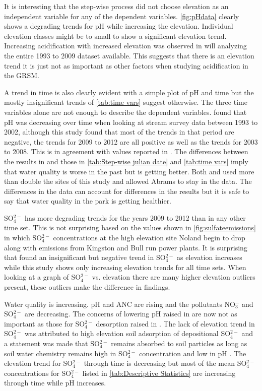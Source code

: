 It is interesting that the step-wise process did not choose elevation as an independent variable for any of the dependent variables. \autoref{fig:pHdata} clearly shows a degrading trends for pH while increasing the elevation. Individual elevation classes might be to small to show a significant elevation trend.  Increasing acidification with increased elevation was observed in \citet{cai2012} will analyzing the entire 1993 to 2009 dataset available.  This suggests that there is an elevation trend it is just not as important as other factors when studying acidification in the GRSM.

A trend in time is also clearly evident with a simple plot of pH and time but the mostly insignificant trends of \autoref{tab:time vars} suggest otherwise. The three time variables alone are not enough to describe the dependent variables.  \citet{robinson2008ph} found that pH was decreasing over time when looking at stream survey data between 1993 to 2002, although this study found that most of the trends in that period are negative, the trends for 2009 to 2012 are all positive as well as the trends for 2003 to 2008.  This is in agreement with values reported in \citet{cai2012}.  The differences between the results in \citet{robinson2008ph} and those in \autoref{tab:Step-wise julian date} and \autoref{tab:time vars} imply that water quality is worse in the past but is getting better.  Both \citet{robinson2008ph} and \citet{cai2012} used more than double the sites of this study and \citet{robinson2008ph} allowed Abrams to stay in the data.  The differences in the data can account for differences in the results but it is safe to say that water quality in the park is getting healthier.

SO$_4^{2-}$ has more degrading trends for the years 2009 to 2012 than in any other time set. This is not surprising based on the values shown in \autoref{fig:sulfateemissions} in which SO$_4^{2-}$ concentrations at the high elevation site Noland begin to drop along with emissions from Kingston and Bull run power plants.  It is surprising that \cite{cai2012} found an insignificant but negative trend in SO$_4^{2-}$ as elevation increases while this study shows only increasing elevation trends for all time sets.  When looking at a graph of SO$_4^{2-}$ vs. elevation there are many higher elevation outliers present, these outliers make the difference in findings.%

Water quality is increasing.  pH and ANC are rising and the pollutants NO$_3^-$ and SO$_4^{2-}$ are decreasing.  The concerns of lowering pH raised in \citet{robinson2008ph} are now not as important as those for SO$_4^{2-}$ desorption raised in \citet{cai2012}.  The lack of elevation trend in SO$_4^{2-}$ was attributed to high elevation soil adsorption of depositional SO$_4^{2-}$ and a statement was made that SO$_4^{2-}$ remains absorbed to soil particles as long as soil water chemistry remains high in SO$_4^{2-}$ concentration and low in pH \citep{cai2011long}.  The elevation trend for SO$_4^{2-}$ through time is decreasing but most of the mean SO$_4^{2-}$ concentrations for SO$_4^{2-}$  listed in \autoref{tab:Descriptive Statistics} are increasing through time while pH increases.

